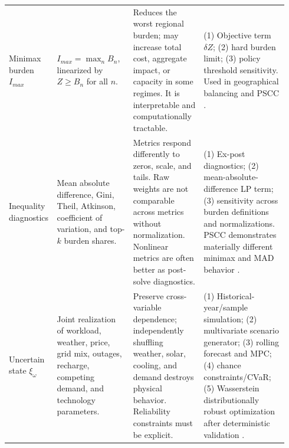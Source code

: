 \documentclass[10pt]{article}
\begin{document}
\begin{landscape}
\begin{longtable}{@{}P{0.12\linewidth}P{0.27\linewidth}P{0.25\linewidth}P{0.30\linewidth}@{}}
Minimax burden $I_{max}$ & $I_{max}=\max_n B_n$, linearized by $Z\ge B_n$ for all $n$. & Reduces the worst regional burden; may increase total cost, aggregate impact, or capacity in some regimes. It is interpretable and computationally tractable. & (1) Objective term $\delta Z$; (2) hard burden limit; (3) policy threshold sensitivity. Used in geographical balancing and PSCC \cite{li2024equitable,chen2026pscc}. \\

Inequality diagnostics & Mean absolute difference, Gini, Theil, Atkinson, coefficient of variation, and top-$k$ burden shares. & Metrics respond differently to zeros, scale, and tails. Raw weights are not comparable across metrics without normalization. Nonlinear metrics are often better as post-solve diagnostics. & (1) Ex-post diagnostics; (2) mean-absolute-difference LP term; (3) sensitivity across burden definitions and normalizations. PSCC demonstrates materially different minimax and MAD behavior \cite{chen2026pscc}. \\

Uncertain state $\xi_\omega$ & Joint realization of workload, weather, price, grid mix, outages, recharge, competing demand, and technology parameters. & Preserve cross-variable dependence; independently shuffling weather, solar, cooling, and demand destroys physical behavior. Reliability constraints must be explicit. & (1) Historical-year/sample simulation; (2) multivariate scenario generator; (3) rolling forecast and MPC; (4) chance constraints/CVaR; (5) Wasserstein distributionally robust optimization after deterministic validation \cite{hall2024probabilistic}. \\
\end{longtable}
\end{landscape}
\end{document}
